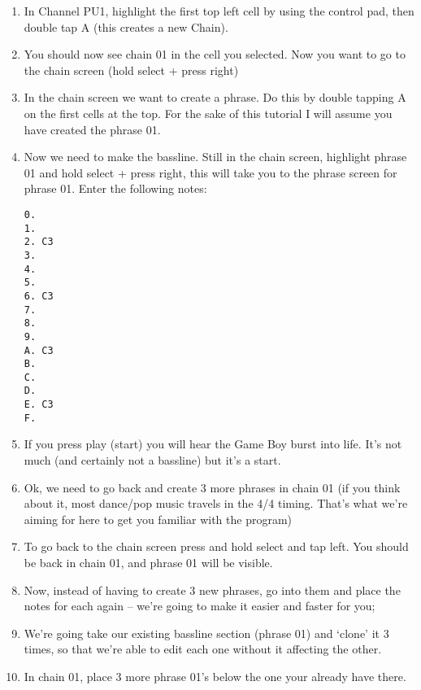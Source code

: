 \documentclass[]{article}
\begin{document}
\begin{enumerate}

\item In Channel PU1, highlight the first top left cell by using the control pad, then double tap A (this creates a new Chain).

\item You should now see chain 01 in the cell you selected. Now you want to go to the chain screen (hold select + press right)

\item In the chain screen we want to create a phrase. Do this by double tapping A on the first cells at the top. For the sake of this tutorial I will assume you have created the phrase 01.

\item Now we need to make the bassline. Still in the chain screen, highlight phrase 01 and hold select + press right, this will take you to the phrase screen for phrase 01. Enter the following notes:
\begin{verbatim}
0.
1.
2. C3
3.
4.
5.
6. C3
7.
8.
9.
A. C3
B.
C.
D.
E. C3
F.
\end{verbatim}

\item If you press play (start) you will hear the Game Boy burst into life. It’s not much (and certainly not a bassline) but it’s a start.

\item Ok, we need to go back and create 3 more phrases in chain 01 (if you think about it, most dance/pop music travels in the 4/4 timing. That’s what we’re aiming for here to get you familiar with the program) %

\item To go back to the chain screen press and hold select and tap left. You should be back in chain 01, and phrase 01 will be visible.

\item Now, instead of having to create 3 new phrases, go into them and place the notes for each again – we’re going to make it easier and faster for you;

\item We’re going take our existing bassline section (phrase 01) and ‘clone’ it 3 times, so that we’re able to edit each one without it affecting the other. %

\item In chain 01, place 3 more phrase 01’s below the one your already have there.


\end{enumerate}
\end{document}
